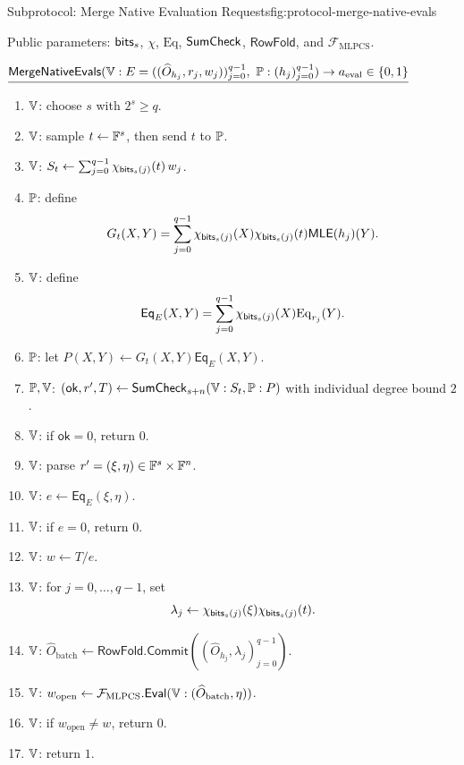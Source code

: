 \begin{protocolbox}{Subprotocol: Merge Native Evaluation Requests}{fig:protocol-merge-native-evals}
\small\raggedright
\noindent Public parameters: \(\mathsf{bits}_s\), \(\chi\), \(\mathrm{Eq}\),
\(\mathsf{SumCheck}\), \(\mathsf{RowFold}\), and
\(\mathcal F_{\mathrm{MLPCS}}\).

\smallskip
\noindent\(\underline{\mathsf{MergeNativeEvals}(\mathbb{V}:E=((\widehat O_{h_j},r_j,w_j))_{j=0}^{q-1},\ \mathbb{P}:(h_j)_{j=0}^{q-1})\to a_{\mathrm{eval}}\in\{0,1\}}\)

\smallskip
\begin{enumerate}[leftmargin=0.24in,label=\textbf{B\arabic*.},itemsep=0.08em,topsep=0.1em,parsep=0pt]
  \item \(\mathbb{V}\): choose \(s\) with \(2^s\ge q\).
  \item \(\mathbb{V}\): sample \(t\leftarrow\mathbb{F}^s\), then send \(t\) to \(\mathbb{P}\).
  \item \(\mathbb{V}\): \(S_t\gets
        \sum_{j=0}^{q-1}\chi_{\mathsf{bits}_s(j)}(t)\,w_j\).
  \item \(\mathbb{P}\): define
        \[
          G_t(X,Y)=
          \sum_{j=0}^{q-1}
            \chi_{\mathsf{bits}_s(j)}(X)\chi_{\mathsf{bits}_s(j)}(t)\mathsf{MLE}(h_j)(Y).
        \]
  \item \(\mathbb{V}\): define
        \[
          \mathsf{Eq}_E(X,Y)=
          \sum_{j=0}^{q-1}
            \chi_{\mathsf{bits}_s(j)}(X)\mathrm{Eq}_{r_j}(Y).
        \]
  \item \(\mathbb{P}\): let
        \(P(X,Y)\gets G_t(X,Y)\mathsf{Eq}_E(X,Y)\).
  \item \(\mathbb{P},\mathbb{V}\): \((\mathsf{ok},r',T)\gets
        \mathsf{SumCheck}_{s+n}(\mathbb{V}:S_t,\mathbb{P}:P)\)
        with individual degree bound \(2\).
  \item \(\mathbb{V}\): if \(\mathsf{ok}=0\), return \(0\).
  \item \(\mathbb{V}\): parse
        \(r'=(\xi,\eta)\in\mathbb{F}^s\times\mathbb{F}^n\).
  \item \(\mathbb{V}\): \(e\gets
        \mathsf{Eq}_E(\xi,\eta)\).
  \item \(\mathbb{V}\): if \(e=0\), return \(0\).
  \item \(\mathbb{V}\): \(w\gets T/e\).
  \item \(\mathbb{V}\): for \(j=0,\ldots,q-1\), set
        \[
          \lambda_j\gets
          \chi_{\mathsf{bits}_s(j)}(\xi)
          \chi_{\mathsf{bits}_s(j)}(t).
        \]
  \item \(\mathbb{V}\): \(\widehat O_{\mathrm{batch}}\gets
        \mathsf{RowFold.Commit}
        ((\widehat O_{h_j},\lambda_j)_{j=0}^{q-1})\).
  \item \(\mathbb{V}\): \(w_{\mathrm{open}}\gets
        \mathcal F_{\mathrm{MLPCS}}.\mathsf{Eval}
        (\mathbb{V}:(\widehat O_{\mathrm{batch}},\eta))\).
  \item \(\mathbb{V}\): if \(w_{\mathrm{open}}\ne w\), return \(0\).
  \item \(\mathbb{V}\): return \(1\).
\end{enumerate}
\end{protocolbox}

